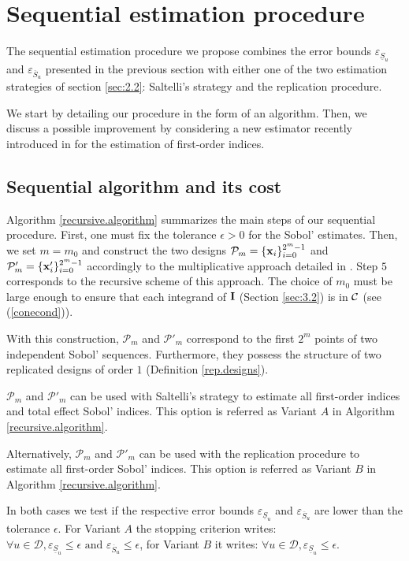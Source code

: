 \section{Sequential estimation procedure}
\label{sec:4}
The sequential estimation procedure we propose combines the error bounds $\varepsilon_{\underline{S}_u}$ and $\varepsilon_{\overline{S}_u}$ presented in the previous section with either one of the two estimation strategies of section \ref{sec:2.2}: Saltelli's strategy and the replication procedure. 

We start by detailing our procedure in the form of an algorithm. Then, we discuss a possible improvement by considering a new estimator recently introduced in \cite{Owen} for the estimation of first-order indices.

\subsection{Sequential algorithm and its cost}
\label{sec:4.1}

Algorithm \ref{recursive.algorithm} summarizes the main steps of our sequential procedure. First, one must fix the tolerance $\epsilon >0$ for the Sobol' estimates. Then, we set $m=m_0$ and construct the two designs $\mathcal{P}_{m}=\{\boldsymbol{\mathbf{x}}_i\}_{i=0}^{2^{m}-1}$ and $\mathcal{P}'_{m}=\{\boldsymbol{\mathbf{x}}'_i\}_{i=0}^{2^{m}-1}$ accordingly to the multiplicative approach detailed in \cite{GJAHMP}.  Step $5$ corresponds to the recursive scheme of this approach. The choice of $m_0$ must be large enough to ensure that each integrand of $\boldsymbol{\mathbf{I}}$ (Section \ref{sec:3.2}) is in $\mathcal{C}$ (see  (\ref{conecond})).

With this construction, $\mathcal{P}_{m}$ and $\mathcal{P}'_{m}$ correspond to the first $2^{m}$ points of two independent Sobol' sequences. Furthermore, they possess the structure of two replicated designs of order $1$ (Definition \ref{rep.designs}).
\bigskip

$\mathcal{P}_{m}$ and $\mathcal{P}'_{m}$ can be used with Saltelli's strategy to estimate all first-order indices and total effect Sobol' indices. This option is referred as Variant $A$ in Algorithm \ref{recursive.algorithm}.

Alternatively, $\mathcal{P}_{m}$ and $\mathcal{P}'_{m}$ can be used with the replication procedure to estimate all first-order Sobol' indices. This option is referred as Variant $B$ in Algorithm \ref{recursive.algorithm}. 

In both cases we test if the respective error bounds $\varepsilon_{\underline{S}_u}$ and $\varepsilon_{\overline{S}_u}$ are lower than the tolerance $\epsilon$. For Variant $A$ the stopping criterion writes: $ \forall u \in \mathcal{D}, \varepsilon_{\underline{S}_u} \leq \epsilon \text{ and } \varepsilon_{\overline{S}_u} \leq \epsilon$,
for Variant $B$ it writes:
$ \forall u \in \mathcal{D}, \varepsilon_{\underline{S}_u} \leq \epsilon.$ 

